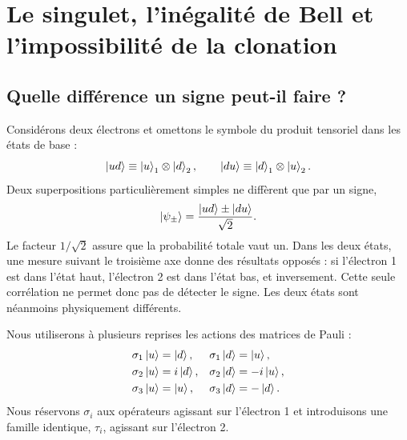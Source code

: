 \chapter{Le singulet, l’inégalité de Bell et l’impossibilité de la clonation}


\section{Quelle différence un signe peut-il faire ?}

Considérons deux électrons et omettons le symbole du produit tensoriel dans les états de base :
\begin{equation}
  \left\lvert ud\right\rangle\equiv\left\lvert u\right\rangle_1\otimes\left\lvert d\right\rangle_2,
  \qquad
  \left\lvert du\right\rangle\equiv\left\lvert d\right\rangle_1\otimes\left\lvert u\right\rangle_2.
\end{equation}
Deux superpositions particulièrement simples ne diffèrent que par un signe,
\begin{equation}
  \left\lvert\psi_\pm\right\rangle
  =
  \frac{\left\lvert ud\right\rangle\pm\left\lvert du\right\rangle}{\sqrt2}.
  \label{eq:l05-two-signs}
\end{equation}
Le facteur \(1/\sqrt2\) assure que la probabilité totale vaut un. Dans les deux états, une mesure suivant le troisième axe donne des résultats opposés : si l’électron 1 est dans l’état haut, l’électron 2 est dans l’état bas, et inversement. Cette seule corrélation ne permet donc pas de détecter le signe. Les deux états sont néanmoins physiquement différents.

Nous utiliserons à plusieurs reprises les actions des matrices de Pauli :
\begin{align}
  \sigma_1\left\lvert u\right\rangle&=\left\lvert d\right\rangle,&
  \sigma_1\left\lvert d\right\rangle&=\left\lvert u\right\rangle,\nonumber\\
  \sigma_2\left\lvert u\right\rangle&=i\left\lvert d\right\rangle,&
  \sigma_2\left\lvert d\right\rangle&=-i\left\lvert u\right\rangle,\nonumber\\
  \sigma_3\left\lvert u\right\rangle&=\left\lvert u\right\rangle,&
  \sigma_3\left\lvert d\right\rangle&=-\left\lvert d\right\rangle.
  \label{eq:l05-pauli-actions}
\end{align}
Nous réservons \(\sigma_i\) aux opérateurs agissant sur l’électron 1 et introduisons une famille identique, \(\tau_i\), agissant sur l’électron 2.

